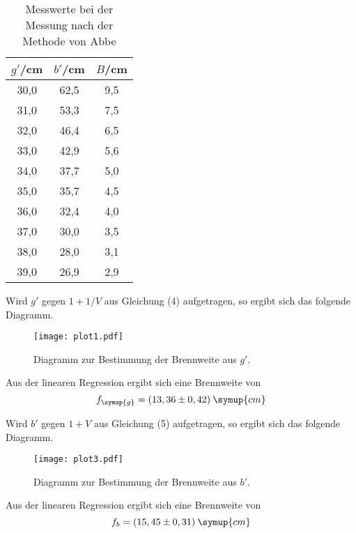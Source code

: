 \begin{table}[H]
  \centering
  \caption{Messwerte bei der Messung nach der Methode von Abbe}
  \label{tab:abbe}
  \begin{tabular}{c c c}
    \toprule
    $g'$/cm  & $b'$/cm & $B$/cm \\
    \midrule
    30,0  &  62,5  &  9,5 \\
    31,0  &  53,3  &  7,5 \\
    32,0  &  46,4  &  6,5 \\
    33,0  &  42,9  &  5,6 \\
    34,0  &  37,7  &  5,0 \\
    35,0  &  35,7  &  4,5 \\
    36,0  &  32,4  &  4,0 \\
    37,0  &  30,0  &  3,5 \\
    38,0  &  28,0  &  3,1 \\
    39,0  &  26,9  &  2,9 \\
    \bottomrule
  \end{tabular}
\end{table}

Wird $g'$ gegen $1+1/V$ aus Gleichung (4) aufgetragen, so ergibt sich das folgende Diagramm.

\begin{figure}[H]
  \centering
  \texttt{[image: plot1.pdf]}
  \caption{Diagramm zur Bestimmung der Brennweite aus $g'$.}
  \label{fig:plot1}
\end{figure}

Aus der linearen Regression ergibt sich eine Brennweite von
\begin{equation*}
  f_{\symup{g}} = (13,36 \pm 0,42)\: \symup{cm}
\end{equation*}

Wird $b'$ gegen $1+V$ aus Gleichung (5) aufgetragen, so ergibt sich das folgende Diagramm.

\begin{figure}[H]
  \centering
  \texttt{[image: plot3.pdf]}
  \caption{Diagramm zur Bestimmung der Brennweite aus $b'$.}
  \label{fig:plot3}
\end{figure}

Aus der linearen Regression ergibt sich eine Brennweite von
\begin{equation*}
  f_b = (15,45 \pm 0,31)\: \symup{cm}
\end{equation*}

